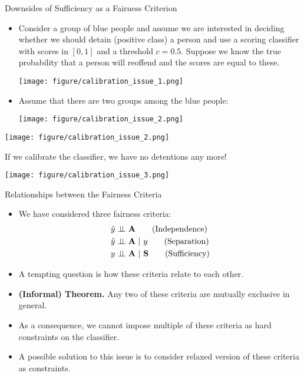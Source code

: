 \documentclass[11pt,compress,t,notes=noshow, xcolor=table]{beamer}
\newcommand{\sens}{\mathbf{A}} %
\newcommand{\indep}{\perp \!\!\! \perp} %
\begin{document}
\begin{vbframe}{Downsides of Sufficiency as a Fairness Criterion}
	\footnotesize{
		\begin{itemize}
			\item Consider a group of blue people and assume we are interested in deciding whether we should detain (positive class) a person and use a scoring classifier with scores in $[0,1]$ and a threshold $c=0.5.$ Suppose we know the true probability that a person will reoffend and the scores are equal to these.
%			
			\begin{center}
				\texttt{[image: figure/calibration\_issue\_1.png]}
			\end{center}  
			\item Assume that there are two groups among the blue people:
%			
			\begin{center}
				\texttt{[image: figure/calibration\_issue\_2.png]}
			\end{center}  
			
		\end{itemize}	
		\framebreak
		
		\begin{center}
			\texttt{[image: figure/calibration\_issue\_2.png]}
		\end{center}  
%		
		If we calibrate the classifier, we have no detentions any more!
%		
		\begin{center}
			\texttt{[image: figure/calibration\_issue\_3.png]}
		\end{center}	
	}
\end{vbframe}


\begin{vbframe}{Relationships between the Fairness Criteria}
	\small{
		\begin{itemize}
			\item We have considered three fairness criteria:
			\begin{align*}
%				
				\yh &\indep \sens \tag{Independence}	\\
%				
				\yh &\indep \sens ~|~ y  \tag{Separation}\\ 
%				
				y &\indep \sens ~|~ 	\mathbf{S} \tag{Sufficiency}
%				
			\end{align*}
			\item A tempting question is how these criteria relate to each other. 
			 
			\item \textbf{(Informal) Theorem.} Any two of these criteria are mutually exclusive in general.
%			 

			\item As a consequence, we cannot impose multiple of these criteria as hard constraints on the classifier.
%			
			\item A possible solution to this issue is to consider relaxed version of these criteria as constraints.
%			
		\end{itemize}
	}
\end{vbframe}
\end{document}
